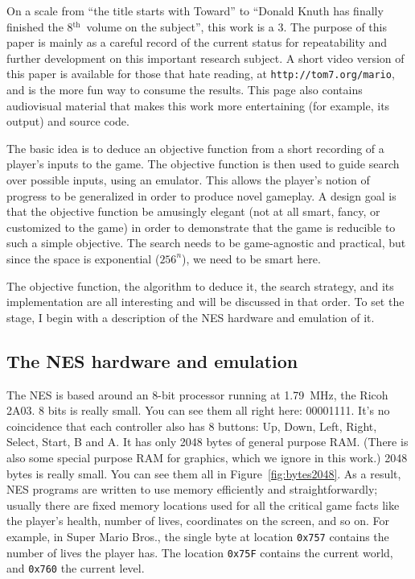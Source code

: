 \documentclass[twocolumn]{article}
\renewcommand\th{$^{\mathrm{th}}$}
\begin{document}
On a scale from ``the title starts with Toward'' to ``Donald Knuth has finally finished the 8\th\ volume on the subject'', this work is a 3. The purpose of this paper is mainly as a careful record of the current status for repeatability and further development on this important research subject. A short video version of this paper is available for those that hate reading, at \verb+http://tom7.org/mario+, and is the more fun way to consume the results. This page also contains audiovisual material that makes this work more entertaining (for example, its output) and source code.

The basic idea is to deduce an objective function from a short recording of a player's inputs to the game. The objective function is then used to guide search over possible inputs, using an emulator. This allows the player's notion of progress to be generalized in order to produce novel gameplay. A design goal is that the objective function be amusingly elegant (not at all smart, fancy, or customized to the game) in order to demonstrate that the game is reducible to such a simple objective. The search needs to be game-agnostic and practical, but since the space is exponential ($256^{n}$), we need to be smart here.

The objective function, the algorithm to deduce it, the search strategy, and its implementation are all interesting and will be discussed in that order. To set the stage, I begin with a description of the NES hardware and emulation of it.

\subsection{The NES hardware and emulation}
The NES is based around an 8-bit processor running at 1.79~MHz, the Ricoh 2A03. 8 bits is really small. You can see them all right here: 00001111. It's no coincidence that each controller also has 8 buttons: Up, Down, Left, Right, Select, Start, B and A. It has only 2048 bytes of general purpose RAM. (There is also some special purpose RAM for graphics, which we ignore in this work.) 2048 bytes is really small. You can see them all in Figure~\ref{fig:bytes2048}. As a result, NES programs are written to use memory efficiently and straightforwardly; usually there are fixed memory locations used for all the critical game facts like the player's health, number of lives, coordinates on the screen, and so on. For example, in Super Mario Bros., the single byte at location \verb+0x757+ contains the number of lives the player has. The location \verb+0x75F+ contains the current world, and \verb+0x760+ the current level.
\end{document}
